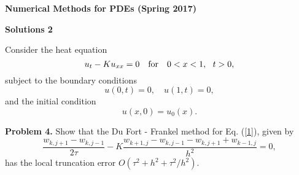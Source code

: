 \documentclass[10pt]{article}
\begin{document}
\begin{center}
{{\bf Numerical Methods for PDEs (Spring 2017)}}
\end{center}


\begin{center}
{\large{\bf Solutions 2}}
\end{center}


\centerline{}


\noindent
Consider the heat equation
\begin{equation}
u_{t}-K u_{xx}=0 \quad \hbox{for} \quad 0<x<1, \ \ t>0, \label{1}
\end{equation}
subject to the boundary conditions
\begin{equation}
u(0,t)=0, \quad u(1, t)=0,  \label{2}
\end{equation}
and the initial condition
\begin{equation}
u(x,0)=u_{0}(x).  \label{3}
\end{equation}






\vskip 0.5cm \noindent
{\bf Problem 4.} Show that the Du Fort -
Frankel method for Eq. (\ref{1}), given by
\[
\frac{w_{k,j+1}-w_{k,j-1}}{2\tau}-K \frac{w_{k+1,
j}-w_{k,j-1}-w_{k,j+1}+w_{k-1,j}}{h^{2}}=0,
\]
has the local truncation error $O\left(\tau^2+h^2+\tau^2/h^2\right)$.
\end{document}
